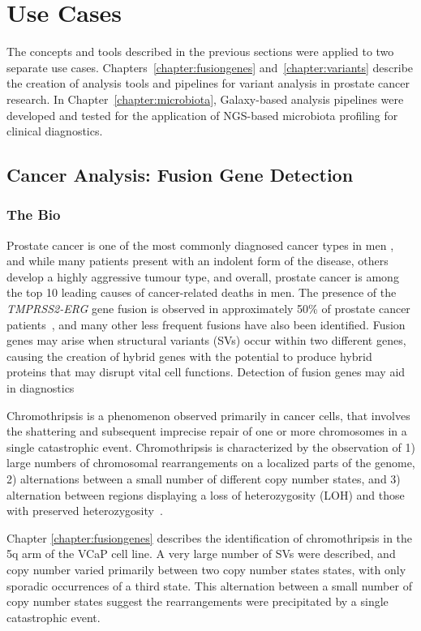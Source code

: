 \section{Use Cases}

The concepts and tools described in the previous sections were applied to two separate use cases. Chapters~\ref{chapter:fusiongenes} and~\ref{chapter:variants} describe the creation of analysis tools and pipelines for variant analysis in prostate cancer research. In Chapter~\ref{chapter:microbiota}, Galaxy-based analysis pipelines were developed and tested for the application of NGS-based microbiota profiling for clinical diagnostics.


\subsection{Cancer Analysis: Fusion Gene Detection}
\subsubsection{The Bio}

Prostate cancer is one of the most commonly diagnosed cancer types in men \cite{jemal2010global}, and while many patients present with an indolent form of the disease, others develop a highly aggressive tumour type, and overall, prostate cancer is among the top 10 leading causes of cancer-related deaths in men. The presence of the \emph{TMPRSS2-ERG} gene fusion is observed in approximately 50\% of prostate cancer patients~\cite{tomlins2005recurrent}, and many other less frequent fusions have also been identified. Fusion genes may arise when structural variants (SVs) occur within two different genes, causing the creation of hybrid genes with the potential to produce hybrid proteins that may disrupt vital cell functions. Detection of fusion genes may aid in diagnostics

Chromothripsis is a phenomenon observed primarily in cancer cells, that involves the shattering and subsequent imprecise repair of one or more chromosomes in a single catastrophic event. Chromothripsis is characterized by the observation of 1) large numbers of chromosomal rearrangements on a localized parts of the genome, 2) alternations between a small number of different copy number states, and 3) alternation between regions displaying a loss of heterozygosity (LOH) and those with preserved heterozygosity~\cite{maher2012chromothripsis}.

Chapter \ref{chapter:fusiongenes} describes the identification of chromothripsis in the 5q arm of the VCaP cell line. A very large number of SVs were described, and copy number varied primarily between two copy number states states, with only sporadic occurrences of a third state. This alternation between a small number of copy number states suggest the rearrangements were precipitated by a single catastrophic event.

